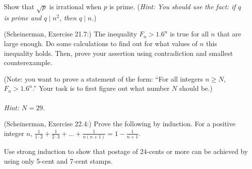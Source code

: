 \documentclass{article}
\theoremstyle{definition}
\begin{document}
\begin{question}
    Show that $\sqrt{p}$ is irrational when $p$ is prime. (\textit{Hint: You should use the fact: if $q$ is prime and $q\mid n^2$, then $q\mid n$.})
\end{question}
\begin{solution}
\end{solution}

\begin{question}
    (Scheinerman, Exercise 21.7:) 
    The inequality $F_n > 1.6^n$ is true for all $n$ that are large enough.  Do some calculations to find out for what values of $n$ this inequality holds.  Then, prove your assertion using contradiction and smallest counterexample.

    (Note: you want to prove a statement of the form: ``For all integers $n \geq N$, $F_n > 1.6^n$.''  Your task is to first figure out what number $N$ should be.)\\~\\
    \textit{Hint: $N=29$.}
\end{question}
\begin{solution}
\end{solution}


\begin{question}
    (Scheinerman, Exercise 22.4:) 
    Prove the following by induction.  For a positive integer $n$, $\displaystyle \frac{1}{1\cdot 2} + \frac{1}{2 \cdot 3} + \ldots + \frac{1}{n(n+1)} = 1 - \frac{1}{n+1}$.
\end{question}
\begin{solution}
\end{solution}



\begin{question}
    Use strong induction to show that postage of 24-cents or more can be achieved by using only 5-cent and 7-cent stamps.
\end{question}
\begin{solution}
\end{solution}
\end{document}
